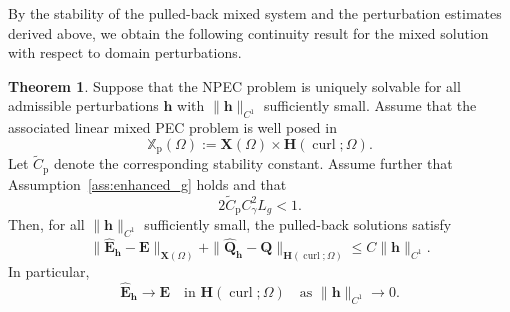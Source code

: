 \documentclass[12pt,reqno]{amsart}
\theoremstyle{definition}
\newtheorem{theo}{Theorem}[section]
\numberwithin{equation}{section}
\begin{document}
By the stability of the pulled-back mixed system and the perturbation estimates
derived above, we obtain the following continuity result for the mixed solution
with respect to domain perturbations.

\begin{theo}\label{thm:continuity_p_mixed}
Suppose that the NPEC problem is uniquely solvable for all admissible
perturbations \(\mathbf h\) with \(\|\mathbf h\|_{C^1}\) sufficiently small.
Assume that the associated linear mixed PEC problem is well posed in
\[
\mathbb X_{\mathrm p}(\Omega)
:=
\mathbf X(\Omega)\times \mathbf H(\operatorname{curl};\Omega).
\]
Let \(\widetilde C_{\mathrm p}\) denote the corresponding stability constant.
Assume further that Assumption~\ref{ass:enhanced_g} holds and that
\[
2\widetilde C_{\mathrm p}C_\gamma^2L_g<1.
\]
Then, for all \(\|\mathbf h\|_{C^1}\) sufficiently small, the pulled-back
solutions satisfy
\[
\|\widehat{\mathbf E}_{\mathbf h}-\mathbf E\|_{\mathbf X(\Omega)}
+
\|\widehat{\mathbf Q}_{\mathbf h}-\mathbf Q\|_{\mathbf H(\operatorname{curl};\Omega)}
\le
C\|\mathbf h\|_{C^1}.
\]
In particular,
\[
\widehat{\mathbf E}_{\mathbf h}\to\mathbf E
\quad\text{in }\mathbf H(\operatorname{curl};\Omega)
\quad\text{as }\|\mathbf h\|_{C^1}\to0.
\]
\end{theo}
\end{document}
